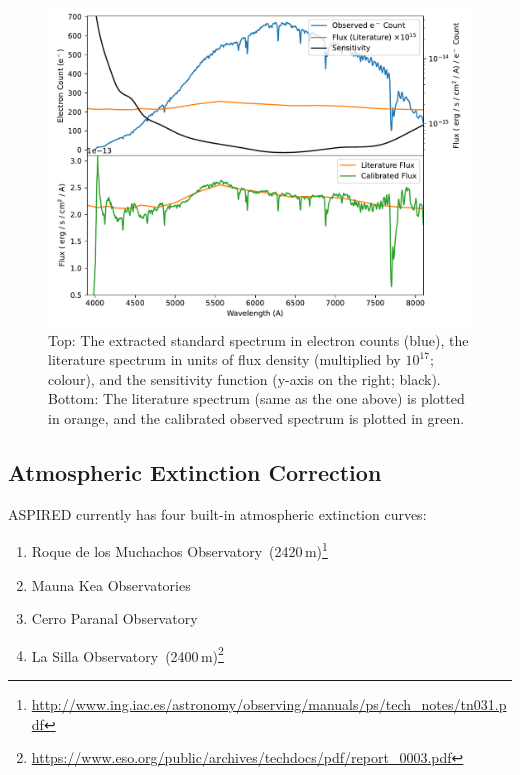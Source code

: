 \documentclass[twocolumn, linenumbers]{aastex631}
\begin{document}
\begin{figure}
    \centering
    \includegraphics[width=\columnwidth]{fig_06_flux_calibration_diagnostics.pdf}
    \caption{Top: The extracted standard spectrum in electron counts
    (blue), the literature spectrum in units of flux density (multiplied
    by $10^{17}$; colour), and the sensitivity function (y-axis on the right; black).
    Bottom: The literature spectrum (same as the one above) is plotted
    in orange, and the calibrated observed spectrum is plotted in green.}
    \label{fig:fluxcal}
\end{figure}

\subsection{Atmospheric Extinction Correction}
\textsc{ASPIRED} currently has four built-in atmospheric extinction curves:

\begin{enumerate}
    \item Roque de los Muchachos Observatory~(2420\,m)\footnote{\url{http://www.ing.iac.es/astronomy/observing/manuals/ps/tech\_notes/tn031.pdf}}
    \item Mauna Kea Observatories~\citep[4205\,m;][]{2013A&A...549A...8B}
    \item Cerro Paranal Observatory~\citep[2635\,m;][]{2011A&A...527A..91P}
    \item La Silla Observatory~(2400\,m)\footnote{\url{https://www.eso.org/public/archives/techdocs/pdf/report\_0003.pdf}}
\end{enumerate}
\end{document}

